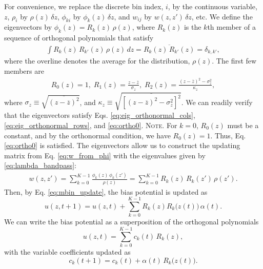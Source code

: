 \documentclass[reprint, superscriptaddress, floatfix]{revtex4-1}
\newcommand{\note}[1]{{\color{DarkGreen}\footnotesize \textsc{Note.} #1}}
\begin{document}
For convenience, we
replace the discrete bin index, $i$,
by the continuous variable, $z$,
%
$\rho_i$ by $\rho(z) \, \delta z$,
$\phi_{ki}$ by $\phi_k(z) \, \delta z$,
and
$w_{ij}$ by $w(z, z') \, \delta z$, etc.
%
We define the eigenvectors by
$\phi_k(z) = R_k(z) \, \rho(z)$,
where $R_k(z)$ is the $k$th member of a sequence of orthogonal polynomials
that satisfy
\begin{align*}
  \int R_k(z) \, R_{k'}(z) \, \rho(z) \, d z
  = \overline{ R_k(z) \, R_{k'}(z) }
  = \delta_{k, k'}
  ,
\end{align*}
%
where the overline denotes the average for the distribution, $\rho(z)$.
%
The first few members are
\begin{align*}
  R_0(z) = 1, \;
  R_1(z) = \frac{z - \overline{z}}{\sigma_z}, \;
  R_2(z) = \frac{ (z - \overline{z})^2 - \sigma_z^2 } {\kappa_z},
\end{align*}
%
where $\sigma_z \equiv \sqrt{\overline{\left(z - \overline z\right)^2}}$,
and
$\kappa_z \equiv \sqrt{\overline{\left[  (z - \overline z)^2 - \sigma_z^2  \right]^2 }}$.
%
We can readily verify that the eigenvectors satisfy
Eqs. \eqref{eq:eig_orthonormal_cols}, \eqref{eq:eig_orthonormal_rows},
and \eqref{eq:ortho0}.
%
\note{For $k = 0$, $R_0(z)$ must be a constant,
  and by the orthonormal condition, we have $R_0(z) = 1$.
  Thus, Eq. \eqref{eq:ortho0} is satisfied.}%
%
The eigenvectors allow us to construct the updating matrix
from Eq. \eqref{eq:w_from_phi}
with the eigenvalues given by \eqref{eq:lambda_bandpass}:
\begin{align*}
  w(z, z')
  =
  \sum_{k=0}^{K-1} \frac{ \phi_k(z) \, \phi_k(z') } { \rho(z) }
  =
  \sum_{k=0}^{K-1} R_k(z) \, R_k(z') \, \rho(z')
  .
\end{align*}
%
%
Then, by Eq. \eqref{eq:mbin_update},
the bias potential is updated as
%
$$
u(z, t+1) = u(z, t)
+ \sum_{k=0}^{K-1} R_k(z) R_k\bigl( z(t) \bigr) \, \alpha(t).
$$
%
We can write the bias potential
as a superposition of the orthogonal polynomials
%
\begin{equation}
  u(z, t) = \sum_{k=0}^{K-1} c_k(t) \, R_k(z),
  \label{eq:uz_decomp}
\end{equation}
%
with the variable coefficients updated as
%
\begin{equation}
  c_k(t+1) = c_k(t) + \alpha(t) \, R_k\bigl( z(t) \bigr)
  .
  \label{eq:ckupdate}
\end{equation}
\end{document}
